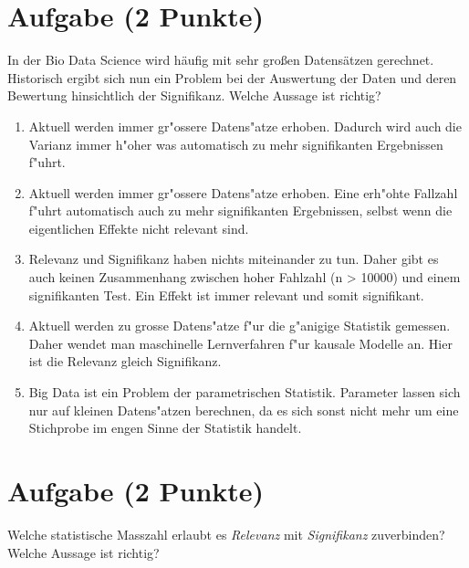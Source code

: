 \documentclass[a4paper, 10pt]{scrartcl}\usepackage[]{graphicx}\usepackage[]{xcolor}
\begin{document}
\section{Aufgabe \hfill (2 Punkte)}

In der Bio Data Science wird h{\"a}ufig mit sehr gro{\ss}en Datens{\"a}tzen
gerechnet. Historisch ergibt sich nun ein Problem bei der Auswertung der
Daten und deren Bewertung hinsichtlich der Signifikanz. Welche Aussage ist richtig?



\begin{enumerate}
\item [\textbf{A} \msquare] Aktuell werden immer gr{"o}ssere Datens{"a}tze erhoben. Dadurch wird auch die Varianz immer h{"o}her was automatisch zu mehr signifikanten Ergebnissen f{"u}hrt.
\item [\textbf{B} \msquare] Aktuell werden immer gr{"o}ssere Datens{"a}tze erhoben. Eine erh{"o}hte Fallzahl f{"u}hrt automatisch auch zu mehr signifikanten Ergebnissen, selbst wenn die eigentlichen Effekte nicht relevant sind.
\item [\textbf{C} \msquare] Relevanz und Signifikanz haben nichts miteinander zu tun. Daher gibt es auch keinen Zusammenhang zwischen hoher Fahlzahl (n > 10000) und einem signifikanten Test. Ein Effekt ist immer relevant und somit signifikant.
\item [\textbf{D} \msquare] Aktuell werden zu grosse Datens{"a}tze f{"u}r die g{"a}nigige Statistik gemessen. Daher wendet man maschinelle Lernverfahren f{"u}r kausale Modelle an. Hier ist die Relevanz gleich Signifikanz.
\item [\textbf{E} \msquare] Big Data ist ein Problem der parametrischen Statistik. Parameter lassen sich nur auf kleinen Datens{"a}tzen berechnen, da es sich sonst nicht mehr um eine Stichprobe im engen Sinne der Statistik handelt.
\end{enumerate}

\section{Aufgabe \hfill (2 Punkte)}

Welche statistische Masszahl erlaubt es \textit{Relevanz} mit
\textit{Signifikanz} zuverbinden? Welche Aussage ist richtig?
\end{document}
